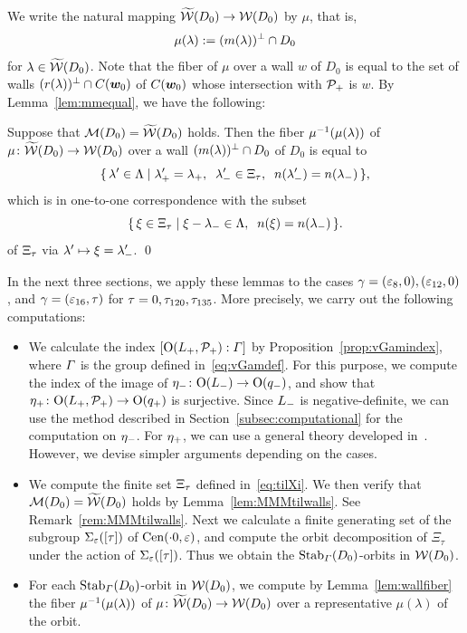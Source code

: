 \documentclass{amsart} %
\begin{document}
%
We write the natural mapping
$\widetilde{\mathord{\mathcal{W}}}(D_0)\to \mathord{\mathcal{W}}(D_0)$
by $\mu$, that is, 
\[
\mu(\lambda):=(m(\lambda))^{\perp}\cap D_0
\]
for $\lambda\in \widetilde{\mathord{\mathcal{W}}}(D_0)$.
Note that the fiber of $\mu$ over a wall $w$
of $D_0$ is equal to the set of walls $(r(\lambda))^{\perp}\cap \mathord{C}(\boldsymbol{w}_0)$
of $\mathord{C}(\boldsymbol{w}_0)$ whose intersection with $\mathord{\mathcal{P}}_{+}$ is $w$.
By Lemma~\ref{lem:mmequal}, we have the following:
%
\begin{lemma}\label{lem:wallfiber}
Suppose that $\mathord{\mathcal{M}}(D_0)=\widetilde{\mathord{\mathcal{W}}} (D_0)$ holds.
Then the fiber $\mu^{-1}(\mu(\lambda))$ of 
$\mu\colon \widetilde{\mathord{\mathcal{W}}}(D_0)\to \mathord{\mathcal{W}}(D_0)$
over a wall $(m(\lambda))^{\perp}\cap D_0$ of $D_0$
is equal to
\[
\set{\lambda\sprime\in \Leech}%
{\lambdaplus\sprime=\lambdaplus, \;\; \lambdaminus\sprime\in \Xitau, \;\; n(\lambdaminus\sprime)=n(\lambdaminus)},
\]
which is in one-to-one correspondence with the subset 
\[
\{\,{\xi\in \Xi_{\tau}}\mid {\xi-{\lambda}_{-}\in \Lambda, \;\; n(\xi)=n({\lambda}_{-})} \,\}.
\]
of $\Xi_{\tau}$ via $\lambda^{\prime} \mapsto \xi={\lambda}_{-}^{\prime}$.
\qed
\end{lemma}
%
In the next three sections, we apply these lemmas to the cases $\gamma=(\varepsilon_8, 0), (\varepsilon_{12}, 0)$,
and $\gamma=(\varepsilon_{16}, \tau)$ for $\tau=0,\tau_{120},\tau_{135}$.
More precisely,
we carry out the following computations:
%
\begin{itemize}
\item 
We calculate the index $[\mathord{\mathrm{O}}(L_{+}, \mathord{\mathcal{P}}_{+}): \varGamma]$ 
by Proposition~\ref{prop:vGamindex},
where $\varGamma$ is the group defined in~\eqref{eq:vGamdef}.
 For this purpose, 
we compute the index of 
the image of ${\eta}_{-}\colon \mathord{\mathrm{O}}(L_{-})\to \mathord{\mathrm{O}}(q_{-})$, and 
show that 
${\eta}_{+}\colon \mathord{\mathrm{O}}(L_{+}, \mathord{\mathcal{P}}_{+})\to \mathord{\mathrm{O}}(q_{+})$
is surjective.
Since $L_{-}$ is negative-definite,
we can use the method described in Section~\ref{subsec:computational}
for the computation on ${\eta}_{-}$.
For ${\eta}_{+}$, 
we can use a general theory developed in~\cite[Chapter VIII]{MirandaMorrison2009}.
However, we devise simpler arguments depending on the cases.
\item 
We compute the finite set $\Xi_{\tau}$
defined in~\eqref{eq:tilXi}.
%
%
We then verify that $\mathord{\mathcal{M}}(D_0)=\widetilde{\mathord{\mathcal{W}}} (D_0)$ holds
by Lemma~\ref{lem:MMMtilwalls}.
See Remark~\ref{rem:MMMtilwalls}.
Next we 
calculate a finite generating set of 
the subgroup $\Sigma_{\varepsilon}([\tau])$ of $\mathrm{Cen}(\cdot 0, \varepsilon)$,
and 
compute the orbit decomposition of $\Xi_{\tau}$ under the action of $\Sigma_{\varepsilon}([\tau])$.
Thus we obtain 
the $\operatorname{Stab}_{\varGamma}(D_0)$-orbits in $\mathord{\mathcal{W}}(D_0)$.
\item
For each $\operatorname{Stab}_{\varGamma}(D_0)$-orbit in $\mathord{\mathcal{W}}(D_0)$,
we compute by Lemma~\ref{lem:wallfiber} the fiber $\mu^{-1}(\mu(\lambda))$ of $\mu\colon \widetilde{\mathord{\mathcal{W}}}(D_0)\to \mathord{\mathcal{W}}(D_0)$
over a representative $\mu(\lambda)$ of the orbit.
\end{itemize}
\end{document}
